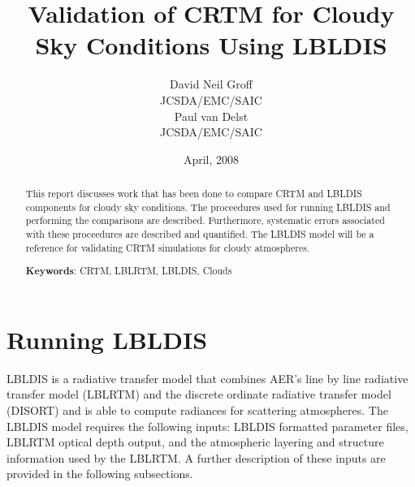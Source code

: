 

\title{Validation of CRTM for Cloudy Sky Conditions Using LBLDIS}
\author{David Neil Groff\\JCSDA/EMC/SAIC\\[0.25in]
        Paul van Delst\\JCSDA/EMC/SAIC\\[0.25in]}
\date{April, 2008}



\maketitle

\begin{abstract}
This report discusses work that has been done to compare CRTM and LBLDIS components for cloudy sky conditions. The proceedures used for running LBLDIS and performing the comparisons are described. Furthermore, systematic errors associated with these proceedures are described and quantified.
The LBLDIS model will be a reference for validating CRTM simulations for cloudy atmospheres. 
   
\textbf{Keywords}: CRTM, LBLRTM, LBLDIS, Clouds  
\end{abstract}




\section{Running LBLDIS}
LBLDIS is a radiative transfer model that combines AER's line by line radiative transfer model (LBLRTM) and the discrete ordinate radiative transfer model (DISORT) and is able to compute radiances
for scattering atmospheres. The LBLDIS model requires the following inputs: LBLDIS formatted parameter files, 
LBLRTM optical depth output, and the atmospheric layering and structure information used by the 
LBLRTM. A further description of these inputs are provided in the following subsections.

